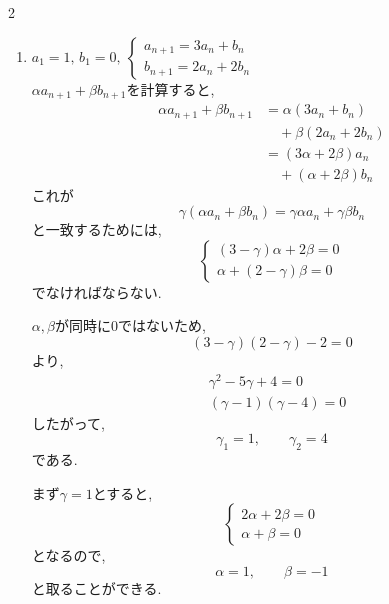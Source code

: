 \documentclass[dvipdfmx,a4paper,11pt,fleqn,openany]{jsbook}
\begin{document}
\begin{multicols*}{2}
\begin{enumerate}[label=(\arabic*),parsep=3pt]
\begin{enumerate}
                    \((1)+(2)\)をすると,
                    \[
                      2a_n=2\cdot4^{n-1}
                    \]
                    なので,
                    \[
                      a_n=4^{n-1}.
                    \]

                    また,\((1)-(2)\)をすると,
                    \[
                      2b_n=2\cdot4^{n-1}
                    \]
                    なので,
                    \[
                      b_n=4^{n-1}.
                    \]
            \end{enumerate}
      \item $\displaystyle a_1=1,\,b_1=0,\ \begin{cases}a_{n+1}=3a_n+b_n\\ b_{n+1}=2a_n+2b_n\end{cases}$\\
            $\alpha a_{n+1}+\beta b_{n+1}$を計算すると,
            \begin{align*}
              \alpha a_{n+1}+\beta b_{n+1}
                &=\alpha(3a_n+b_n)\\
                &\quad +\beta(2a_n+2b_n)\\
                &=(3\alpha+2\beta)a_n\\
                &\quad +(\alpha+2\beta)b_n
            \end{align*}
            これが
            \[
              \gamma(\alpha a_n+\beta b_n)
              =\gamma\alpha a_n+\gamma\beta b_n
            \]
            と一致するためには,
            \[
            \begin{cases}
              (3-\gamma)\alpha+2\beta=0\\
              \alpha+(2-\gamma)\beta=0
            \end{cases}
            \]
            でなければならない.

            $\alpha,\beta$が同時に$0$ではないため,
            \[
              (3-\gamma)(2-\gamma)-2=0
            \]
            より,
            \begin{align*}
              &\gamma^2-5\gamma+4=0\\
              &(\gamma-1)(\gamma-4)=0
            \end{align*}
            したがって,
            \[
              \gamma_1=1,\qquad\gamma_2=4
            \]
            である.

            まず$\gamma=1$とすると,
            \[
            \begin{cases}
              2\alpha+2\beta=0\\
              \alpha+\beta=0
            \end{cases}
            \]
            となるので,
            \[
              \alpha=1,\qquad\beta=-1
            \]
            と取ることができる.


\end{enumerate}
\end{multicols*}
\end{document}
